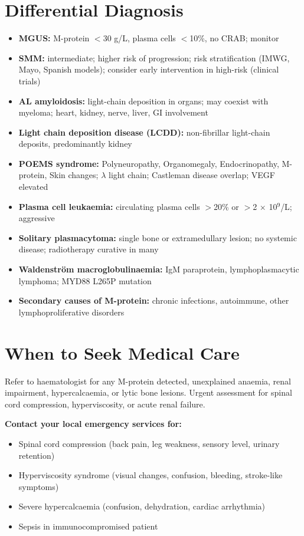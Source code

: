 \section*{Differential Diagnosis}
\begin{itemize}
    \item \textbf{MGUS:} M-protein $<$30 g/L, plasma cells $<$10\%, no CRAB; monitor
    \item \textbf{SMM:} intermediate; higher risk of progression; risk stratification (IMWG, Mayo, Spanish models); consider early intervention in high-risk (clinical trials)
    \item \textbf{AL amyloidosis:} light-chain deposition in organs; may coexist with myeloma; heart, kidney, nerve, liver, GI involvement
    \item \textbf{Light chain deposition disease (LCDD):} non-fibrillar light-chain deposits, predominantly kidney
    \item \textbf{POEMS syndrome:} Polyneuropathy, Organomegaly, Endocrinopathy, M-protein, Skin changes; $\lambda$ light chain; Castleman disease overlap; VEGF elevated
    \item \textbf{Plasma cell leukaemia:} circulating plasma cells $>$20\% or $>$2 $\times$ 10$^9$/L; aggressive
    \item \textbf{Solitary plasmacytoma:} single bone or extramedullary lesion; no systemic disease; radiotherapy curative in many
    \item \textbf{Waldenstr\"om macroglobulinaemia:} IgM paraprotein, lymphoplasmacytic lymphoma; MYD88 L265P mutation
    \item \textbf{Secondary causes of M-protein:} chronic infections, autoimmune, other lymphoproliferative disorders
\end{itemize}

\section*{When to Seek Medical Care}
Refer to haematologist for any M-protein detected, unexplained anaemia, renal impairment, hypercalcaemia, or lytic bone lesions. Urgent assessment for spinal cord compression, hyperviscosity, or acute renal failure.

\textbf{Contact your local emergency services for:}
\begin{itemize}
    \item Spinal cord compression (back pain, leg weakness, sensory level, urinary retention)
    \item Hyperviscosity syndrome (visual changes, confusion, bleeding, stroke-like symptoms)
    \item Severe hypercalcaemia (confusion, dehydration, cardiac arrhythmia)
    \item Sepsis in immunocompromised patient
\end{itemize}

